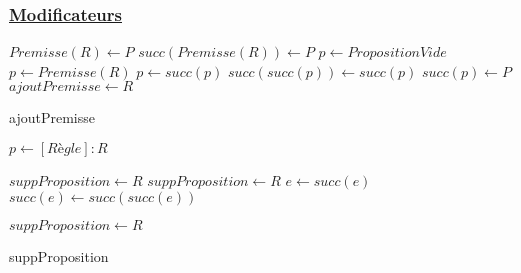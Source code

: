 \documentclass{article}
\begin{document}
\subsubsection{\underline{Modificateurs}}
\begin{algorithm}
    \SetAlgoLined

    \begin{algorithmic}

          \THEN
             \THEN
                \STATE $Premisse(R) \gets P$
            \ELSE
                 \THEN
                    \STATE $succ(Premisse(R)) \gets P$
                \ELSE
                    \STATE $p \gets PropositionVide$
                    \STATE $p \gets Premisse(R)$
                        \STATE $p \gets succ(p)$
                    \ENDWHILE
                    \STATE $succ(succ(p)) \gets succ(p)$
                    \STATE $succ(p) \gets P$
                \ENDIF
            \ENDIF
         \ENDIF
         \STATE $ajoutPremisse \gets R$
    \end{algorithmic}
    \caption{ajoutPremisse}
\end{algorithm}



\begin{algorithm}
    \SetAlgoLined
    \KwResult{[Règle]}

    \begin{algorithmic}

        \STATE $p \gets [Règle] : R$

            \STATE $suppProposition \gets R$
        \ELSE
                \STATE $suppProposition \gets R$
            \ELSE
                    \STATE $e \gets succ(e)$
                \ENDWHILE
                \STATE $succ(e) \gets succ(succ(e))$

                \STATE $suppProposition \gets R$
            \ENDIF
        \ENDIF

    \end{algorithmic}
    \caption{suppProposition}
\end{algorithm}
\end{document}
